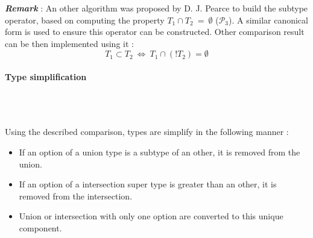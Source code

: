 \documentclass[10pt,a4paper]{article}
\renewcommand{\indent}{~\\\vspace{-.8cm}}
\newcommand{\Dfrac}[2]{%
	\ooalign{%
		$\genfrac{}{}{2.4pt}0{\phantom{#1}}{\phantom{#2}}$\cr%
		$\genfrac{}{}{.8pt}0{#1}{#2}$\cr%
		$\color{white}\genfrac{}{}{.8pt}0{\phantom{#1}}{\phantom{#2}}$}
}
\begin{document}
%
%
%
%
%
%


\textbf{\textit{Remark}} : An other algorithm was proposed by D. J. Pearce \cite{SubTyping} to build the subtype operator, based on computing the property $T_1 \cap T_2 ~=~ \emptyset$ ($\mathcal P_3$). A similar canonical form is used to ensure this operator can be constructed. Other comparison result can be then implemented using it :
\[
	T_1 \subset T_2 ~\Leftrightarrow~ T_1 \cap (!T_2) = \emptyset
\]


\paragraph{Type simplification} ~\\\indent

Using the described comparison, types are simplify in the following manner :

\begin{itemize}
	\item If an option of a union type is a subtype of an other, it is removed from the union.
	\item If an option of a intersection super type is greater than an other, it is removed from the intersection.
	\item Union or intersection with only one option are converted to this unique component.
\end{itemize}
\end{document}

